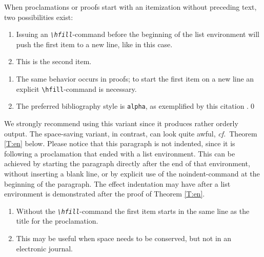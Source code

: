 \documentclass{jpc} %
\theoremstyle{plain}\newtheorem{satz}[thm]{Satz} %
\def\cf{{\em cf.}}
\begin{document}
  When proclamations or proofs start with an itemization without
  preceding text, two possibilities exist:

\begin{thm}\label{T:m}\hfill  %
\begin{enumerate}
\item
  Issuing an {\em\texttt{\textbackslash hfill}}-command before the
  beginning of the list environment will push the first item to a new
  line, like in this case.
\item
  This is the second item.
\end{enumerate}
\end{thm}

\proof\hfill  %
\begin{enumerate}
\item
  The same behavior occurs in proofs; to start the first item on a
  new line an explicit \texttt{\textbackslash hfill}-command is necessary.
\item
  The preferred bibliography style is \texttt{alpha}, as exemplified
  by this citation \cite{Abowd:Nissim:Skinner:2009}.\qed
\end{enumerate}

  \noindent We strongly recommend using this variant since it produces
  rather orderly output.  The space-saving variant, in contrast, can
  look quite awful, \cf~Theorem \ref{T:en} below.  Please notice that
  this paragraph is not indented, since it is following a proclamation
  that ended with a list environment.  This can be achieved by
  starting the paragraph directly after the end of that environment,
  without inserting a blank line, or by explicit use of the
  noindent-command at the beginning of the paragraph.  The effect
  indentation may have after a list environment is demonstrated after
  the proof of Theorem \ref{T:en}. 
 
\begin{thm}\label{T:en} %

\begin{enumerate}%
\item  
  Without the \emph{\texttt{\textbackslash hfill}}-command the first item
  starts in the same line as the title for the proclamation.
\item
  This may be useful when space needs to be conserved, but not in an
  electronic journal.
\end{enumerate}
\end{thm}
\end{document}
